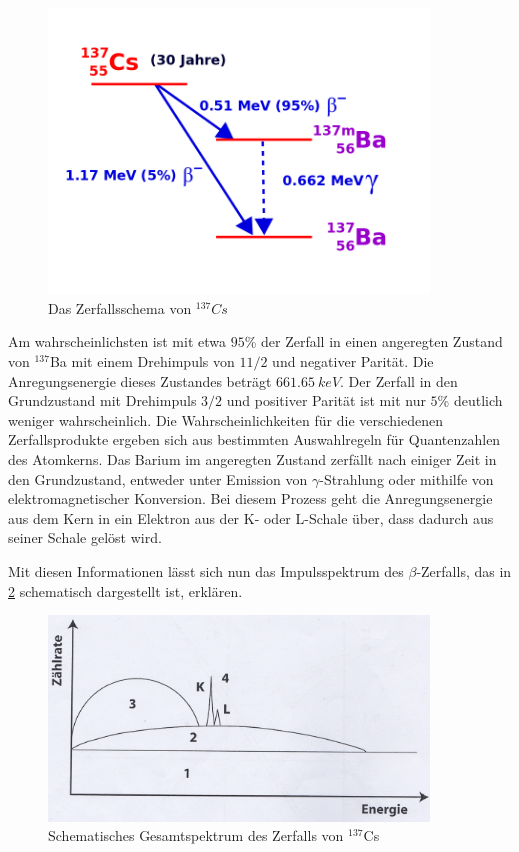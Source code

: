 \begin{figure}[h]
	\centering
	\includegraphics[width=0.9\textwidth]{zerfallsschema.png}
	\caption{Das Zerfallsschema von $^{137}Cs$ \cite{Zerfallsschema}}
	\label{schema}
\end{figure}

Am wahrscheinlichsten ist mit etwa $95$\% der Zerfall in einen angeregten Zustand von $^{137}$Ba mit einem Drehimpuls von $11/2$ und negativer Parität. Die Anregungsenergie dieses Zustandes beträgt $\SI{661,65}{keV}$. Der Zerfall in den Grundzustand mit Drehimpuls $3/2$ und positiver Parität ist mit nur $5$\% deutlich weniger wahrscheinlich. Die Wahrscheinlichkeiten für die verschiedenen Zerfallsprodukte ergeben sich aus bestimmten Auswahlregeln für Quantenzahlen des Atomkerns. Das Barium im angeregten Zustand zerfällt nach einiger Zeit in den Grundzustand, entweder unter Emission von $\gamma$-Strahlung oder mithilfe von elektromagnetischer Konversion. Bei diesem Prozess geht die Anregungsenergie aus dem Kern in ein Elektron aus der K- oder L-Schale über, dass dadurch aus seiner Schale gelöst wird.

Mit diesen Informationen lässt sich nun das Impulsspektrum des $\beta$-Zerfalls, das in \cref{spektrum} schematisch dargestellt ist, erklären.

\begin{figure}[h]
	\centering
	\includegraphics[width=0.9\textwidth]{Spektrum.jpg}
	\caption{Schematisches Gesamtspektrum des Zerfalls von $^{137}$Cs \cite[27]{anleitung-ws2014}}
	\label{spektrum}
\end{figure}

